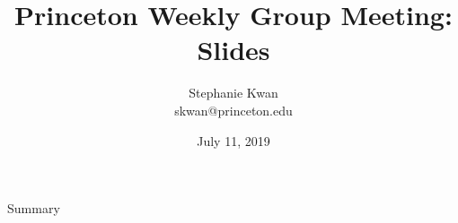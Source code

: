 \documentclass[handout,t]{beamer}
\title[Princeton Group Meeting]{
	Princeton Weekly Group Meeting: \\ Slides}
\date{July 11, 2019}
\author[Stephanie Kwan]{
	Stephanie Kwan \\
	\textrm{skwan@princeton.edu} %
}
\institute[Institutions]{
	Princeton University}
\begin{document}
    
\frame{\titlepage}
\section[]{}
\begin{frame}{Summary}
	\tableofcontents
\end{frame}











%

\end{document}
